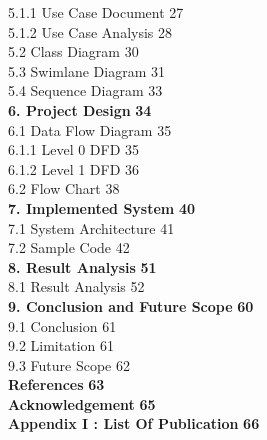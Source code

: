 \documentclass[12pt]{article}
\begin{document}
\hspace{1cm} 5.1.1 Use Case Document \hfill 27 \\ [6pt]
\hspace{1cm} 5.1.2 Use Case Analysis \hfill 28 \\ [6pt]
\hspace{1cm} 5.2 Class Diagram \hfill 30 \\ [6pt]
\hspace{1cm} 5.3 Swimlane Diagram \hfill 31 \\ [6pt]
\hspace{1cm} 5.4 Sequence Diagram \hfill 33 \\ [6pt]
\textbf{6. Project Design} \hfill \textbf{34} \\ [6pt]
\hspace{1cm} 6.1 Data Flow Diagram \hfill 35 \\ [6pt]
\hspace{1cm} 6.1.1 Level 0 DFD \hfill 35 \\ [6pt]
\hspace{1cm} 6.1.2 Level 1 DFD \hfill 36 \\ [6pt]
\hspace{1cm} 6.2 Flow Chart \hfill 38 \\ [6pt]
\textbf{7. Implemented System} \hfill \textbf{40} \\ [6pt]
\hspace{1cm} 7.1 System Architecture \hfill 41 \\ [6pt]
\hspace{1cm} 7.2 Sample Code \hfill 42 \\ [6pt]
\textbf{8. Result Analysis} \hfill \textbf{51} \\ [6pt]
\hspace{1cm} 8.1 Result Analysis \hfill 52 \\ [6pt]
\textbf{9. Conclusion and Future Scope} \hfill \textbf{60} \\ [6pt]
\hspace{1cm} 9.1 Conclusion \hfill 61 \\ [6pt]
\hspace{1cm} 9.2 Limitation \hfill 61 \\ [6pt]
\hspace{1cm} 9.3 Future Scope \hfill 62 \\ [6pt]
\textbf{References} \hfill \textbf{63} \\ [6pt]
\textbf{Acknowledgement} \hfill \textbf{65} \\ [6pt]
\textbf{Appendix I : List Of Publication} \hfill \textbf{66} \\ [6pt]
\end{document}
